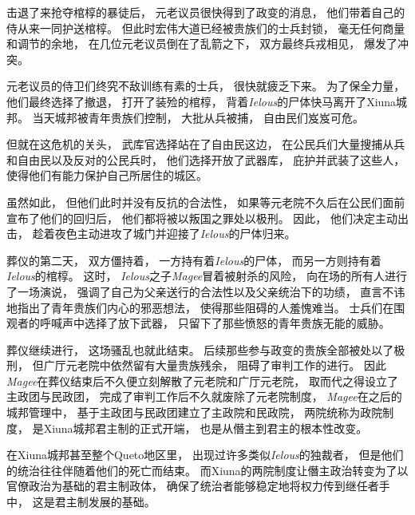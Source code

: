 \documentclass[12pt, a4paper]{ctexart}
\begin{document}
        击退了来抢夺棺椁的暴徒后，
        元老议员很快得到了政变的消息，
        他们带着自己的侍从来一同护送棺椁。
        但此时宏伟大道已经被贵族们的士兵封锁，
        毫无任何商量和调节的余地，
        在几位元老议员倒在了乱箭之下，
        双方最终兵戎相见，
        爆发了冲突。

        元老议员的侍卫们终究不敌训练有素的士兵，
        很快就疲乏下来。
        为了保全力量，
        他们最终选择了撤退，
        打开了装殓的棺椁，
        背着\emph{Ielous}的尸体快马离开了Xiuna城邦。
        当天城邦被青年贵族们控制，
        大批从兵被捕，
        自由民们岌岌可危。

        但就在这危机的关头，
        武库官选择站在了自由民这边，
        在公民兵们大量搜捕从兵和自由民以及反对的公民兵时，
        他们选择开放了武器库，
        庇护并武装了这些人，
        使得他们有能力保护自己所居住的城区。

        虽然如此，
        但他们此时并没有反抗的合法性，
        如果等元老院不久后在公民们面前宣布了他们的回归后，
        他们都将被以叛国之罪处以极刑。
        因此，
        他们决定主动出击，
        趁着夜色主动进攻了城门并迎接了\emph{Ielous}的尸体归来。

        葬仪的第二天，
        双方僵持着，
        一方持有着\emph{Ielous}的尸体，
        而另一方则持有着\emph{Ielous}的棺椁。
        这时，
        \emph{Ielous}之子\emph{Magee}冒着被射杀的风险，
        向在场的所有人进行了一场演说，
        强调了自己为父亲送行的合法性以及父亲统治下的功绩，
        直言不讳地指出了青年贵族们内心的邪恶想法，
        使得那些阻碍的人羞愧难当。
        士兵们在围观者的呼喊声中选择了放下武器，
        只留下了那些愤怒的青年贵族无能的威胁。

        葬仪继续进行，
        这场骚乱也就此结束。
        后续那些参与政变的贵族全部被处以了极刑，
        但广厅元老院中依然留有大量贵族残余，
        阻碍了审判工作的进行。
        因此\emph{Magee}在葬仪结束后不久便立刻解散了元老院和广厅元老院，
        取而代之得设立了主政团与民政团，
        完成了审判工作后不久就废除了元老院制度，
        \emph{Magee}在之后的城邦管理中，
        基于主政团与民政团建立了主政院和民政院，
        两院统称为政院制度，
        是Xiuna城邦君主制的正式开端，
        也是从僭主到君主的根本性改变。

        在Xiuna城邦甚至整个Queto地区里，
        出现过许多类似\emph{Ielous}的独裁者，
        但是他们的统治往往伴随着他们的死亡而结束。
        而Xiuna的两院制度让僭主政治转变为了以官僚政治为基础的君主制政体，
        确保了统治者能够稳定地将权力传到继任者手中，
        这是君主制发展的基础。
\end{document}
